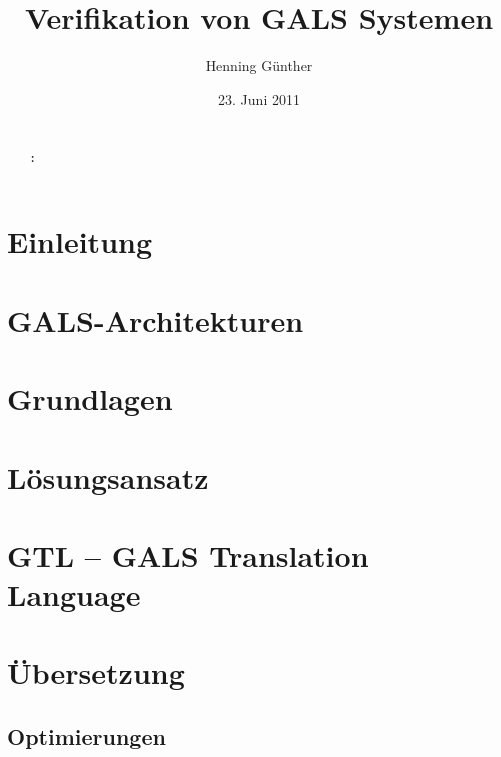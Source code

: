 \documentclass[masterarbeit]{thesis}
\title{Verifikation von GALS Systemen}
\author{Henning Günther}
\date{23. Juni 2011}
\begin{document}
\maketitle

\pagestyle{headings}
\makeatletter
\erklaerung{\@author}
\makeatother

\begin{abstract}
  \thispagestyle{headings}
  
  \\[5pt]
  {\bf \keywordsname :} \makeatletter\@keywords\makeatother
\end{abstract}
\cleardoublepage
{}
\tableofcontents
\listoffigures
\listoftables
\lstlistoflistings
\cleardoublepage
{}
\chapter{Einleitung}

\chapter{GALS-Architekturen}
\label{sec:gals}

\chapter{Grundlagen}
\label{sec:basics}







\chapter{Lösungsansatz}
\label{sec:solution}

\chapter{GTL -- GALS Translation Language}
\label{sec:gtl}

\chapter{Übersetzung}
\label{sec:translation}





\section{Optimierungen}



\end{document}
